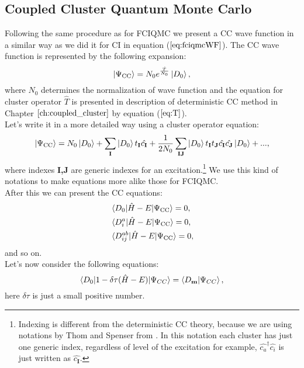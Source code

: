 \documentclass[twoside,english]{uiofysmaster}
\theoremstyle{definition}
\begin{document}
\subsection{Coupled Cluster Quantum Monte Carlo}\label{sec:CCQMC}
Following the same procedure as for FCIQMC we present a CC wave function in a similar way as we did it for CI in equation ($\ref{eq:fciqmcWF}$). The CC wave function is represented by the following expansion:
\begin{equation}\label{eq:ccqmcWF}
\ket{\Psi_{\text{CC}}}= N_0 e^{\frac{\hat{T}}{N_0}}\ket{D_0},
\end{equation}
where $N_0$ determines the normalization of wave function and the equation for cluster operator $\hat{T}$ is presented in description of deterministic CC method in Chapter $\ref{ch:coupled_cluster}$ by equation ($\ref{eq:T}$). \\
Let's write it in a more detailed way using a cluster operator equation:
\begin{align}
\ket{\Psi_{\text{CC}}}=N_0\ket{D_0} + \sum_{\textbf{I}} \ket{D_0} t_\textbf{I} \hat{c_\textbf{I}} + \frac{1}{2N_0}
 \sum_{\textbf{IJ}} \ket{D_0} t_\textbf{I} t_\textbf{J}\hat{c_\textbf{I}} \hat{c_\textbf{J}}\ket{D_0} + ...,
\end{align}
where indexes \textbf{I,J} are generic indexes for an excitation.\footnote{Indexing is different from the deterministic CC theory, because we are using notations by Thom and Spenser from \cite{spencerDevelopmentsStochasticCoupled2016}. In this notation each cluster has just one generic index, regardless of level of the excitation for example, $ \hat{c_a}^\dagger \hat{c_i}$ is just written as $\hat{c_\textbf{I}}$.} We use this kind of notations to make equations more alike those for FCIQMC.\\ 
After this we can present the CC equations:
\begin{align}\label{eq:CCQMC1}
&\braket{D_0|\hat{H}-E|\Psi_{\text{CC}}}=0,\\
&\braket{D_i^a|\hat{H}-E|\Psi_{\text{CC}}}=0,\\
&\braket{D_{ij}^{ab}|\hat{H}-E|\Psi_{\text{CC}}}=0,\\
\end{align} 
and so on.\\
Let's now consider the following equations:
\begin{equation}\label{eq::CCQMCproj}
\braket{D_0|1-\delta \tau (\hat{H}-E)|\Psi_{CC}}=\braket{D_\textbf{m}|\Psi_{CC}},
\end{equation}
here $\delta \tau$ is just a small positive number. 
\end{document}
